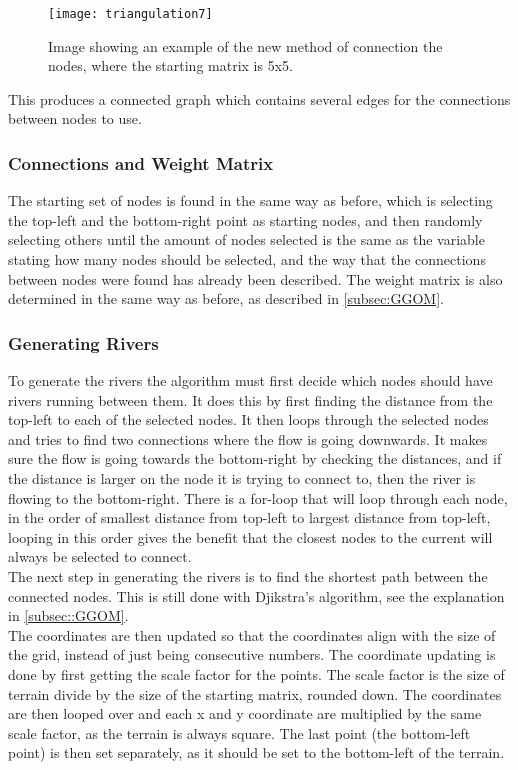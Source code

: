 \begin{figure}[H]
	\texttt{[image: triangulation7]}
	\centering
	\caption{Image showing an example of the new method of connection the nodes, where the starting matrix is 5x5.}
	\label{fig:triangulation7}
\end{figure}

	This produces a connected graph which contains several edges for the connections between nodes to use.\\

\subsubsection{Connections and Weight Matrix}
	The starting set of nodes is found in the same way as before, which is selecting the top-left and the bottom-right point as starting nodes, and then randomly selecting others until the amount of nodes selected is the same as the variable stating how many nodes should be selected, and the way that the connections between nodes were found has already been described.
	The weight matrix is also determined in the same way as before, as described in \ref{subsec:GGOM}.

\subsubsection{Generating Rivers}
	To generate the rivers the algorithm must first decide which nodes should have rivers running between them. It does this by first finding the distance from the top-left to each of the selected nodes. It then loops through the selected nodes and tries to find two connections where the flow is going downwards. It makes sure the flow is going towards the bottom-right by checking the distances, and if the distance is larger on the node it is trying to connect to, then the river is flowing to the bottom-right. There is a for-loop that will loop through each node, in the order of smallest distance from top-left to largest distance from top-left, looping in this order gives the benefit that the closest nodes to the current will always be selected to connect.\\


	The next step in generating the rivers is to find the shortest path between the connected nodes. This is still done with Djikstra's algorithm, see the explanation in \ref{subsec::GGOM}.\\
	The coordinates are then updated so that the coordinates align with the size of the grid, instead of just being consecutive numbers. The coordinate updating is done by first getting the scale factor for the points. The scale factor is the size of terrain divide by the size of the starting matrix, rounded down. The coordinates are then looped over and each x and y coordinate are multiplied by the same scale factor, as the terrain is always square. The last point (the bottom-left point) is then set separately, as it should be set to the bottom-left of the terrain. \\

